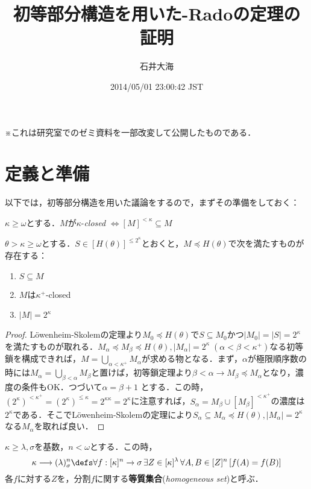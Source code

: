 \documentclass[a4j,lualatex,ja=standard]{bxjsarticle}
\title{初等部分構造を用いた\Erdos-Radoの定理の証明}
\author{石井大海}
\date{2014/05/01 23:00:42 JST}
\begin{document}
\maketitle

※これは研究室でのゼミ資料を一部改変して公開したものである．
\section{定義と準備}
以下では，初等部分構造を用いた議論をするので，まずその準備をしておく：
\begin{definition}
 $\kappa \geq \omega$とする．$M$が$\kappa$-{\itshape closed} $\Leftrightarrow [M]^{<\kappa} \subseteq M$
\end{definition}

\begin{lemma}\label{lem:LS-generalized}
 $\theta > \kappa \geq \omega$とする．$S \in [H(\theta)]^{\leq 2^\kappa}$とおくと，$M \preccurlyeq H(\theta)$で次を満たすものが存在する：
 \begin{enumerate}
  \item $S \subseteq M$
  \item $M$は$\kappa^+$-closed
  \item $|M| = 2^\kappa$
 \end{enumerate}
\end{lemma}
\begin{proof}
 L\"{o}wenheim-Skolemの定理より$M_0 \preccurlyeq H(\theta)$で$S \subseteq M_0$かつ$|M_0| = |S| = 2^\kappa$を満たすものが取れる．$M_\alpha \preccurlyeq M_\beta \preccurlyeq H(\theta), |M_\alpha| = 2^\kappa\; (\alpha < \beta < \kappa^+)$なる初等鎖を構成できれば，$M = \bigcup_{\alpha < \kappa^+} M_\alpha$が求める物となる．まず，$\alpha$が極限順序数の時には$M_\alpha = \bigcup_{\beta < \alpha} M_\beta$と置けば，初等鎖定理より$\beta < \alpha \rightarrow M_\beta \preccurlyeq M_\alpha$となり，濃度の条件もOK．つづいて$\alpha = \beta + 1$ とする．この時，$(2^{\kappa})^{<\kappa^+} =(2^\kappa)^{\leq \kappa} = 2^{\kappa \kappa} = 2^\kappa$に注意すれば，$S_\alpha = M_\beta \cup [M_\beta]^{<\kappa^+}$の濃度は$2^\kappa$である．そこでL\"{o}wenheim-Skolemの定理により$S_\alpha \subseteq M_\alpha \preccurlyeq H(\theta), |M_\alpha| = 2^\kappa$なる$M_\alpha$を取れば良い．\mbox{}
\end{proof}
\begin{definition}
 $\kappa \geq \lambda, \sigma$を基数，$n<\omega$とする．この時，
 \[
 \kappa \longrightarrow (\lambda)^n_\sigma
 \defs \forall f: [\kappa]^n \to \sigma\, \exists Z \in [\kappa]^\lambda\, \forall A, B \in [Z]^n \left[ f(A) = f(B)\right]
 \]
 各$f$に対する$Z$を，分割$f$に関する{\bfseries 等質集合}({\itshape homogeneous set})と呼ぶ．
\end{definition}
\end{document}
